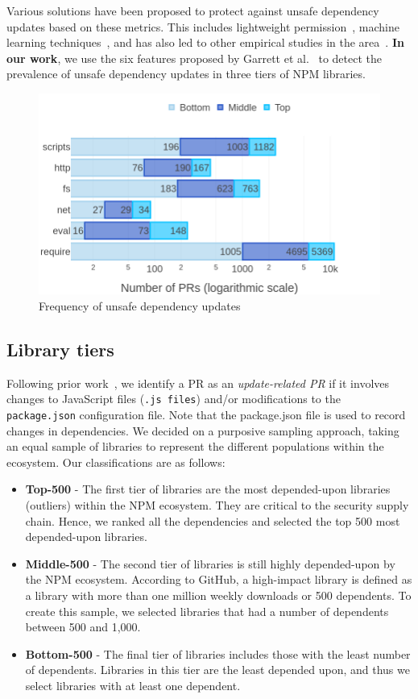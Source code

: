 \documentclass[sigconf,screen]{acmart}
\newcommand\toppkg{Top-500}
\newcommand\midpkg{Middle-500}
\newcommand\lowpkg{Bottom-500}
\begin{document}
\begin{sloppy}
Various solutions have been proposed to protect against unsafe dependency updates based on these metrics.
This includes lightweight permission~\citep{Ferreira:icse2021}, machine learning techniques~\citep{sejfia:icse2022}, and has also led to other empirical studies in the area~\citep{duan:ndss2022}.
\textbf{In our work}, we use the six features proposed by Garrett et al.~\citep{GarrettICSE-NIER19} to detect the prevalence of unsafe dependency updates in three tiers of NPM libraries. 

\begin{figure}
\centering
\includegraphics[width=.8\linewidth]{figs/RQ1_keyword_new.png}
\caption{Frequency of unsafe dependency updates}
\label{fig:rq1_keywords}
\end{figure}




\subsection{Library tiers}

Following prior work~\citep{GarrettICSE-NIER19}, we identify a PR as an \textit{update-related PR} if it involves changes to JavaScript files (\texttt{.js files}) and/or modifications to the \texttt{package.json} configuration file.
Note that the package.json file is used to record changes in dependencies.
We decided on a purposive sampling approach, taking an equal sample of libraries to represent the different populations within the ecosystem.
Our classifications are as follows:
\begin{itemize}
    \item \textbf{\toppkg} - The first tier of libraries are the most depended-upon libraries (outliers) within the NPM ecosystem. They are critical to the security supply chain. Hence, we ranked all the dependencies and selected the top 500 most depended-upon libraries. 
    \item \textbf{\midpkg} - The second tier of libraries is still highly depended-upon by the NPM ecosystem.
    According to GitHub, a high-impact library is defined as a library with more than one million weekly downloads or 500 dependents.
    To create this sample, we selected libraries that had a number of dependents between 500 and 1,000.
    \item \textbf{\lowpkg} - The final tier of libraries includes those with the least number of dependents. Libraries in this tier are the least depended upon, and thus we select libraries with at least one dependent.
\end{itemize}


\end{sloppy}
\end{document}
